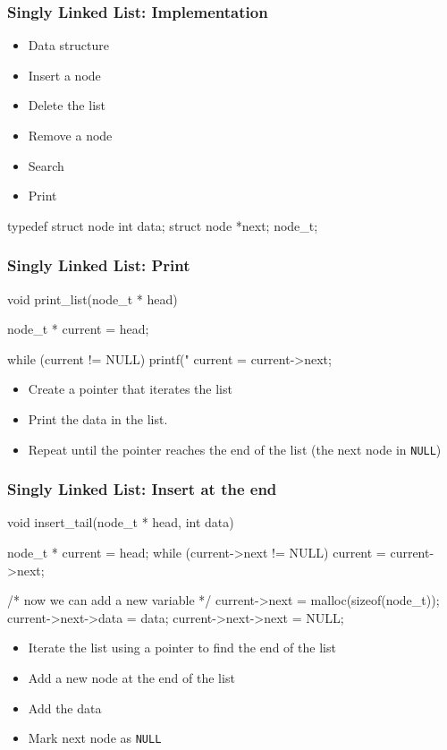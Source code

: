 \documentclass[newPxFont,sthlmFooter,nooffset]{beamer}
\begin{document}
\begin{frame}[t, fragile]
  \frametitle{Singly Linked List: Implementation}
  \begin{itemize}
  \item Data structure
  \item Insert a node
  \item Delete the list
  \item Remove a node
  \item Search
  \item Print
  \end{itemize}

  \begin{ncodedef}
typedef struct node {
    int data;
    struct node *next; 
} node_t;
  \end{ncodedef}  

\end{frame}


\begin{frame}[t, fragile]
  \frametitle{Singly Linked List: Print}
\begin{ncodedef}
void print_list(node_t * head) {
    node_t * current = head;

    while (current != NULL) {
        printf("%
        current = current->next;
    }
}  
\end{ncodedef}
\bigskip
  \begin{itemize}
  \item Create a pointer that iterates the list
  \item Print the data in the list.
  \item Repeat until the pointer reaches the end of the list
    (the next node in \texttt{NULL})
  \end{itemize}

\end{frame}

\begin{frame}[t, fragile]
  \frametitle{Singly Linked List: Insert at the end}

  \begin{ncodedef}
void insert_tail(node_t * head, int data) {
    node_t * current = head;
    while (current->next != NULL) {
        current = current->next;
    }

    /* now we can add a new variable */
    current->next = malloc(sizeof(node_t));
    current->next->data = data;
    current->next->next = NULL;
}
  \end{ncodedef}  
\bigskip
  \begin{itemize}
  \item Iterate the list using a pointer to find the end of the list
  \item Add a new node at the end of the list
  \item Add the data
  \item Mark next node as \texttt{NULL}
  \end{itemize}

\end{frame}
\end{document}
